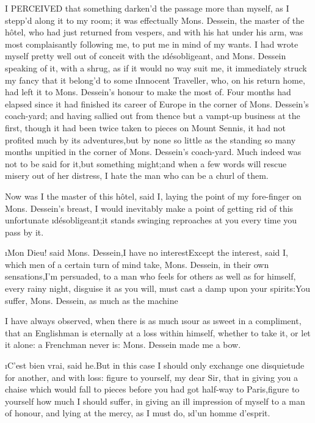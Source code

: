 \documentclass[twoside]{article}
\begin{document}
I PERCEIVED that something darken’d the passage more than myself, as I
stepp’d along it to my room; it was effectually Mons. Dessein, the master
of the hôtel, who had just returned from vespers, and with his hat under
his arm, was most complaisantly following me, to put me in mind of my
wants.  I had wrote myself pretty well out of conceit with the
\i{désobligeant}, and Mons. Dessein speaking of it, with a shrug, as if it
would no way suit me, it immediately struck my fancy that it belong’d to
some \i{Innocent Traveller}, who, on his return home, had left it to Mons.
Dessein’s honour to make the most of.  Four months had elapsed since it
had finished its career of Europe in the corner of Mons. Dessein’s
coach-yard; and having sallied out from thence but a vampt-up business at
the first, though it had been twice taken to pieces on Mount Sennis, it
had not profited much by its adventures,\tsk but by none so little as the
standing so many months unpitied in the corner of Mons. Dessein’s
coach-yard.  Much indeed was not to be said for it,\tsk but something
might;\tsk and when a few words will rescue misery out of her distress, I
hate the man who can be a churl of them.

\tsk Now was I the master of this hôtel, said I, laying the point of my
fore-finger on Mons. Dessein’s breast, I would inevitably make a point of
getting rid of this unfortunate \i{désobligeant};\tsk it stands swinging
reproaches at you every time you pass by it.

\i{Mon Dieu}! said Mons. Dessein,\tsk I have no interest\tsk Except the interest,
said I, which men of a certain turn of mind take, Mons. Dessein, in their
own sensations,\tsk I’m persuaded, to a man who feels for others as well as
for himself, every rainy night, disguise it as you will, must cast a damp
upon your spirits:\tsk You suffer, Mons. Dessein, as much as the machine\tsk 

I have always observed, when there is as much \i{sour} as \i{sweet} in a
compliment, that an Englishman is eternally at a loss within himself,
whether to take it, or let it alone: a Frenchman never is: Mons. Dessein
made me a bow.

\i{C’est bien vrai}, said he.\tsk But in this case I should only exchange one
disquietude for another, and with loss: figure to yourself, my dear Sir,
that in giving you a chaise which would fall to pieces before you had got
half-way to Paris,\tsk figure to yourself how much I should suffer, in giving
an ill impression of myself to a man of honour, and lying at the mercy,
as I must do, \i{d’un homme d’esprit}.
\end{document}
